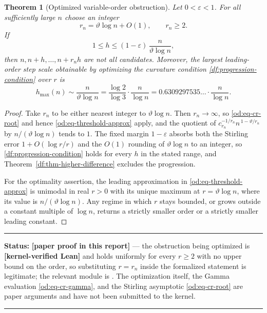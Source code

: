\documentclass[11pt,oneside]{article}
\newtheorem{theorem}{Theorem}[section]
\theoremstyle{definition}
\theoremstyle{remark}
\newcommand{\thetaq}{\vartheta}
\newcommand{\lean}[1]{\texttt{\detokenize{#1}}}
\newcommand{\statuslean}{\textcolor{leanblue}{\textbf{[kernel-verified Lean]}}}
\newcommand{\statusnew}{\textcolor{newgreen}{\textbf{[paper proof in this report]}}}
\newenvironment{statusbox}[1]
{\begin{center}\begin{minipage}{0.94\textwidth}\raggedright\hbadness=10000\hrule
\vspace{0.45em}\textbf{Status:} #1\par\vspace{0.35em}}
{\vspace{0.35em}\hrule\end{minipage}\end{center}}
\begin{document}
\begin{theorem}[Optimized variable-order obstruction]
\label{od:thm-optimized}
Let $0<\varepsilon<1$.  For all sufficiently large $n$ choose an integer
\[
 r_n=\thetaq\log n+O(1),\qquad r_n\ge2 .
\]
If
\[
 1\le h\le(1-\varepsilon)\,\frac{n}{\thetaq\log n},
\]
then $n,n+h,\dots,n+r_nh$ are not all candidates.  Moreover, the largest leading-order step
scale obtainable by optimizing the curvature condition \eqref{df:progression-condition} over
$r$ is
\[
 h_{\max}(n)\sim\frac{n}{\thetaq\log n}
 =\frac{\log2}{\log3}\cdot\frac{n}{\log n}
 =0.6309297535\ldots\cdot\frac{n}{\log n}.
\]
\end{theorem}

\begin{proof}
Take $r_n$ to be either nearest integer to $\thetaq\log n$.  Then $r_n\to\infty$, so
\eqref{od:eq-cr-root} and hence \eqref{od:eq-threshold-approx} apply, and the quotient of
$c_{r_n}^{-1/r_n}n^{\,1-\thetaq/r_n}$ by $n/(\thetaq\log n)$ tends to $1$.  The fixed margin
$1-\varepsilon$ absorbs both the Stirling error $1+O(\log r/r)$ and the $O(1)$ rounding of
$\thetaq\log n$ to an integer, so \eqref{df:progression-condition} holds for every $h$ in the
stated range, and Theorem~\ref{df:thm-higher-difference} excludes the progression.

For the optimality assertion, the leading approximation in \eqref{od:eq-threshold-approx} is
unimodal in real $r>0$ with its unique maximum at $r=\thetaq\log n$, where its value is
$n/(\thetaq\log n)$.  Any regime in which $r$ stays bounded, or grows outside a constant
multiple of $\log n$, returns a strictly smaller order or a strictly smaller leading constant.
\end{proof}

\begin{statusbox}{\statusnew{} --- the obstruction being optimized is \statuslean{} and holds
uniformly for every $r\ge2$ with no upper bound on the order, so substituting $r=r_n$ inside
the formalized statement is legitimate; the relevant module is \lean{HigherDifference}.  The
optimization itself, the Gamma evaluation \eqref{od:eq-cr-gamma}, and the Stirling asymptotic
\eqref{od:eq-cr-root} are paper arguments and have not been submitted to the kernel.}
\end{statusbox}
\end{document}
